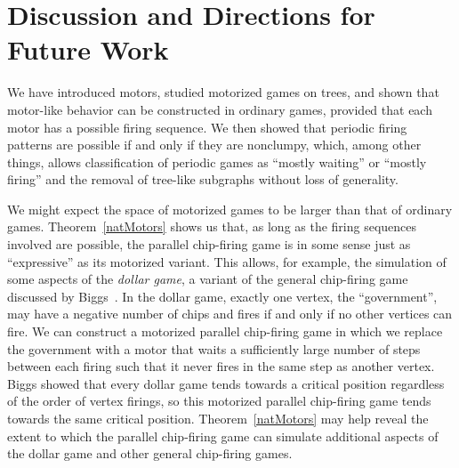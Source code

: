 \section{Discussion and Directions for Future Work} \label{discussion}

We have introduced motors, studied motorized games on trees, and shown that
motor-like behavior can be constructed in ordinary games, provided that each
motor has a possible firing sequence. We then showed that periodic firing
patterns are possible if and only if they are nonclumpy, which, among other
things, allows classification of periodic games as ``mostly waiting'' or
``mostly firing'' and the removal of tree-like subgraphs without loss of
generality.

We might expect the space of motorized games to be larger than that of ordinary
games. Theorem~\ref{natMotors} shows us that, as long as the firing sequences
involved are possible, the parallel chip-firing game is in some sense just as
``expressive'' as its motorized variant. This allows, for example, the
simulation of some aspects of the \emph{dollar game}, a variant of the general
chip-firing game discussed by Biggs~\cite{biggs}. In the dollar game, exactly
one vertex, the ``government'', may have a negative number of chips and fires
if and only if no other vertices can fire. We can construct a motorized
parallel chip-firing game in which we replace the government with a motor that
waits a sufficiently large number of steps between each firing such that it
never fires in the same step as another vertex. Biggs showed that every dollar
game tends towards a critical position regardless of the order of vertex
firings, so this motorized parallel chip-firing game tends towards the same
critical position. Theorem~\ref{natMotors} may help reveal the extent to which
the parallel chip-firing game can simulate additional aspects of the dollar
game and other general chip-firing games.

